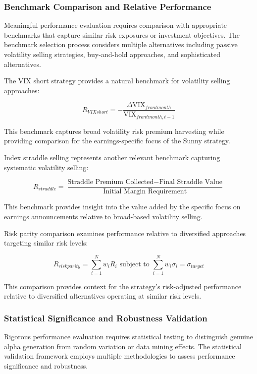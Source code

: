 \documentclass[
  american,
  11pt,
  11pt,
  letterpaper,
  onecolumn]{article}
\begin{document}
\subsubsection{Benchmark Comparison and Relative
Performance}\label{benchmark-comparison-and-relative-performance}

Meaningful performance evaluation requires comparison with appropriate
benchmarks that capture similar risk exposures or investment objectives.
The benchmark selection process considers multiple alternatives
including passive volatility selling strategies, buy-and-hold
approaches, and sophisticated alternatives.

The VIX short strategy provides a natural benchmark for volatility
selling approaches:

\[R_{VIX short} = -\frac{\Delta \text{VIX}_{front month}}{\text{VIX}_{front month, t-1}}\]

This benchmark captures broad volatility risk premium harvesting while
providing comparison for the earnings-specific focus of the Sunny
strategy.

Index straddle selling represents another relevant benchmark capturing
systematic volatility selling:

\[R_{straddle} = \frac{\text{Straddle Premium Collected} - \text{Final Straddle Value}}{\text{Initial Margin Requirement}}\]

This benchmark provides insight into the value added by the specific
focus on earnings announcements relative to broad-based volatility
selling.

Risk parity comparison examines performance relative to diversified
approaches targeting similar risk levels:

\[R_{risk parity} = \sum_{i=1}^{N} w_i R_i \text{ subject to } \sum_{i=1}^{N} w_i \sigma_i = \sigma_{target}\]

This comparison provides context for the strategy's risk-adjusted
performance relative to diversified alternatives operating at similar
risk levels.

\subsubsection{Statistical Significance and Robustness
Validation}\label{statistical-significance-and-robustness-validation}

Rigorous performance evaluation requires statistical testing to
distinguish genuine alpha generation from random variation or data
mining effects. The statistical validation framework employs multiple
methodologies to assess performance significance and robustness.
\end{document}
